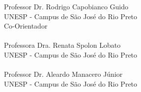 \fontsize{14}{\baselineskip} \selectfont
Professor Dr. Rodrigo Capobianco Guido \\ 
UNESP - Campus de São José do Rio Preto \\
Co-Orientador \\\\

Professora Dra. Renata Spolon Lobato \\ 
UNESP - Campus de São José do Rio Preto \\\\

Professor Dr. Aleardo Manacero Júnior \\
UNESP - Campus de São José do Rio Preto \\\\